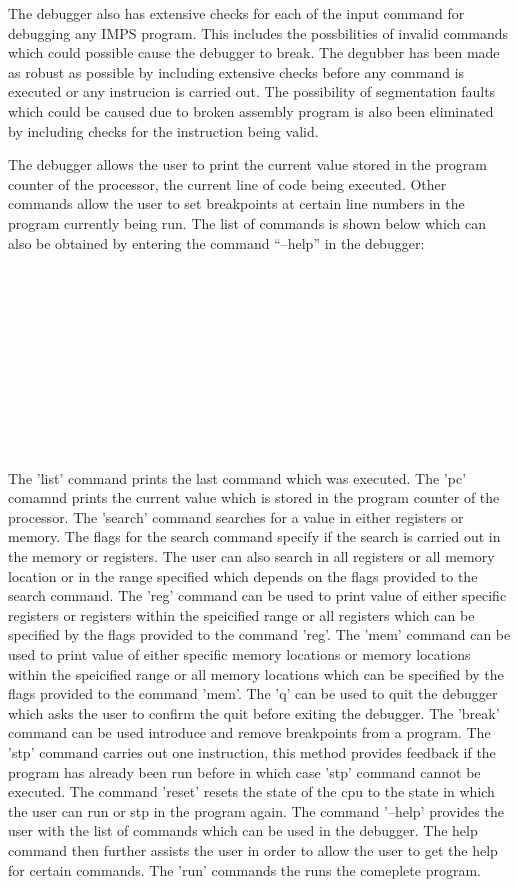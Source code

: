 \documentclass[12pt,a4paper,oneside]{report}
\begin{document}
The debugger also has extensive checks for each of the input command for debugging  any IMPS program. This includes the possbilities of invalid commands which could possible cause the debugger to break. The degubber has been made as robust as possible by including extensive checks before any command is executed or any instrucion is carried out. The possibility of segmentation faults which could be caused due to  broken assembly program is also been eliminated by including checks for the instruction being valid. 

The debugger allows the user to print the current value stored in the program counter of the processor, the current line of code being executed. Other commands allow the user to set breakpoints at certain line numbers in the program currently being run. The list of commands is shown below which can also be obtained by entering the command “--help” in the debugger:\\
 \\
\\
\\
\\
\\
\\
\\
\\
\\
\\
\\
The 'list' command prints the last command which was executed. The 'pc' comamnd prints the current value which is stored in the program counter of the processor. The 'search' command searches for a value in either registers or memory. The flags for the search command specify if the search is carried out in the memory or registers. The user can also search in all registers or all memory location or in the range specified which depends on the flags provided to the search command. The 'reg' command can be used to print value of either specific registers or registers within the speicified range or all registers which can be specified by the flags provided to the command 'reg'. The 'mem' command can be used to print value of either specific memory locations or memory locations within the speicified range or all memory locations which can be specified by the flags provided to the command 'mem'. The 'q' can be used to quit the debugger which asks the user to confirm the quit before exiting the debugger. The 'break' command can be used introduce and remove breakpoints from a  program. The 'stp' command carries out one instruction, this method provides feedback if the program has already been run before in which case 'stp' command cannot be executed. The command 'reset' resets the state of the cpu to the state in which the user can run or stp in the program again. The command '--help' provides the user with the list of commands which can be used in the debugger. The help command then further assists the user in order to allow the user to get the help for certain commands. The 'run' commands the runs the comeplete program.
\end{document}
